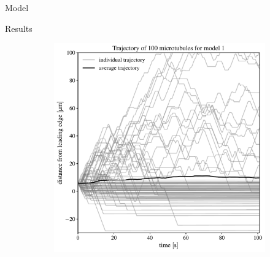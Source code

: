 \documentclass{beamer}
\newlength{\colwidth}
\begin{document}
\begin{frame}[t]
\begin{columns}[t]
\begin{column}{\colwidth}
\begin{block}{Model}
\end{block}

\begin{block}{Results}

\begin{figure}
    \begin{subfigure}{0.45\textwidth}
    \centering
    \includegraphics[width=\linewidth]{../.figures/mt_trajectory_m1.pdf}
    \caption{\label{fig:traj_m1}}
    \end{subfigure}%
    \hfill
    \begin{subfigure}{0.45\textwidth}
    \centering

\end{subfigure}
\end{figure}
\end{block}
\end{column}
\end{columns}
\end{frame}
\end{document}
